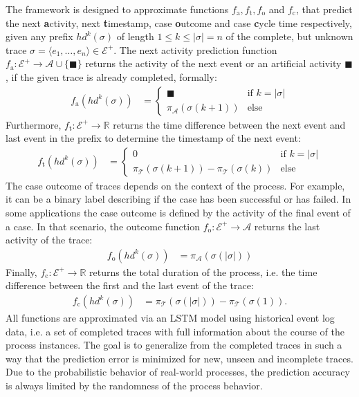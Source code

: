 The framework is designed to approximate functions $f_\mathrm{a}, f_\mathrm{t}, f_\mathrm{o}$ and $f_\mathrm{c}$, that predict the next \textbf{a}ctivity, next \textbf{t}imestamp, case \textbf{o}utcome and case \textbf{c}ycle time respectively, given any prefix $hd^k(\sigma)$ of length $1 \leq k \leq |\sigma| = n$ of the complete, but unknown trace $\sigma = \langle e_1, \dots, e_{n} \rangle \in \mathcal{E}^+$.
The next activity prediction function $f_\mathrm{a}\colon \mathcal{E}^+ \to \mathcal{A} \cup \{\blacksquare\}$ returns the activity of the next event or an artificial activity $\blacksquare$, if the given trace is already completed, formally:
\begin{align*}
f_\mathrm{a}(hd^k(\sigma)) &= 
\begin{cases}
	\blacksquare& \text{if $k = |\sigma|$} \\
	\pi_\mathcal{A}(\sigma(k+1)) & \text{else} 
\end{cases}
\end{align*}
Furthermore, $f_\mathrm{t} \colon \mathcal{E}^+ \to \mathbb{R}$ returns the time difference between the next event and last event in the prefix to determine the timestamp of the next event:
\begin{align*}
f_\mathrm{t}(hd^k(\sigma)) &=
\begin{cases}
0 & \text{if $k = |\sigma|$} \\
\pi_\mathcal{T}(\sigma(k+1)) - \pi_\mathcal{T}(\sigma(k)) & \text{else} 
\end{cases}
\end{align*}
The case outcome of traces depends on the context of the process.
For example, it can be a binary label describing if the case has been successful or has failed.
In some applications the case outcome is defined by the activity of the final event of a case.
In that scenario, the outcome function $f_\mathrm{o} \colon \mathcal{E}^+ \to \mathcal{A}$ returns the last activity of the trace:
\begin{align*}
f_\mathrm{o}(hd^k(\sigma)) &= \pi_\mathcal{A}(\sigma(|\sigma|))
\end{align*}
Finally, $f_\mathrm{c} \colon \mathcal{E}^+ \to \mathbb{R}$ returns the total duration of the process, i.e. the time difference between the first and the last event of the trace:
\begin{align*}
f_\mathrm{c}(hd^k(\sigma)) &=  \pi_\mathcal{T}(\sigma(|\sigma|))-  \pi_\mathcal{T}(\sigma(1)).
\end{align*}
All functions are approximated via an LSTM model using historical event log data, i.e. a set of completed traces with full information about the course of the process instances.
The goal is to generalize from the completed traces in such a way that the prediction error is minimized for new, unseen and incomplete traces.
Due to the probabilistic behavior of real-world processes, the prediction accuracy is always limited by the randomness of the process behavior.

